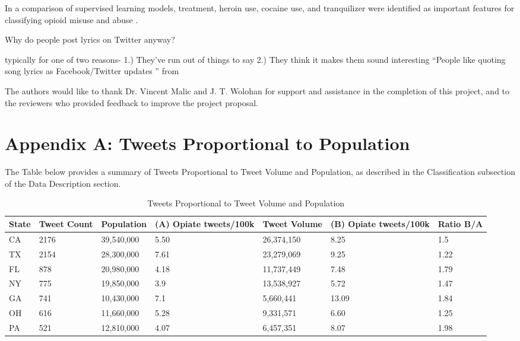\documentclass[sigconf]{acmart}
\begin{document}
In a comparison of supervised 
learning models, treatment, heroin use, cocaine use, and tranquilizer were 
identified as important features for classifying opioid misuse and abuse 
\cite{shiverick17}. 
 
 
Why do people post lyrics on Twitter anyway? 


typically for one of two reasons- 1.) They’ve run out of things to say 
2.) They think it makes them sound interesting
“People like quoting song lyrics as Facebook/Twitter updates ” from 
 
 
 

\begin{acks}
  The authors would like to thank Dr. Vincent Malic and J. T. Wolohan 
  for support and assistance in the completion of this project, and to the
  reviewers who provided feedback to improve the project proposal.
\end{acks}


 


\appendix

\section{Appendix A: Tweets Proportional to Population}
The Table below provides a summary of Tweets Proportional to Tweet 
Volume and Population, as described in the Classification subsection of 
the Data Description section.

\begin{table}[ht]
\centering
\caption{Tweets Proportional to Tweet Volume and Population}
\label{tab:1}
  \begin{tabular}{lllllll}
    \toprule
    State & Tweet Count & Population & (A) Opiate tweets/100k & Tweet Volume & 
    (B) Opiate tweets/100k & Ratio B/A \\
    \midrule     
    CA& 2176& 39,540,000& 5.50& 26,374,150& 8.25& 1.5 \\
    TX& 2154& 28,300,000& 7.61& 23,279,069& 9.25& 1.22 \\
    FL& 878& 20,980,000& 4.18& 11,737,449& 7.48& 1.79 \\
    NY& 775& 19,850,000& 3.9& 13,538,927& 5.72& 1.47 \\
    GA& 741& 10,430,000& 7.1& 5,660,441& 13.09& 1.84 \\
    OH& 616& 11,660,000& 5.28& 9,331,571& 6.60 & 1.25 \\
    PA& 521& 12,810,000& 4.07& 6,457,351& 8.07& 1.98 \\	
    \bottomrule
  \end{tabular}
\end{table}





%
\end{document}
